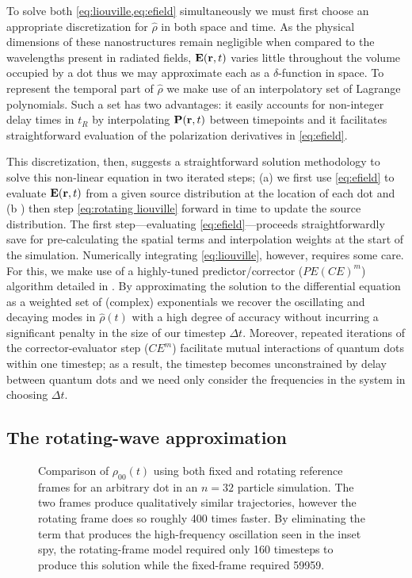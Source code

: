 \documentclass[conference]{IEEEtran}
\begin{document}
To solve both \cref{eq:liouville,eq:efield} simultaneously we must first choose an appropriate discretization for $\hat{\rho}$ in both space and time.
As the physical dimensions of these nanostructures remain negligible when compared to the wavelengths present in radiated fields, $\vb{E}(\vb{r}, t)$ varies little throughout the volume occupied by a dot thus we may approximate each as a $\delta$-function in space.
To represent the temporal part of $\hat{\rho}$ we make use of an interpolatory set of Lagrange polynomials.
Such a set has two advantages: it easily accounts for non-integer delay times in $t_R$ by interpolating $\vb{P}(\vb{r}, t)$ between timepoints and it facilitates straightforward evaluation of the polarization derivatives in \cref{eq:efield}.

This discretization, then, suggests a straightforward solution methodology to solve this non-linear equation in two iterated steps; (a) we first use \cref{eq:efield} to evaluate $\vb{E}(\vb{r}, t)$ from a given source distribution at the location of each dot and (b ) then step \cref{eq:rotating liouville} forward in time to update the source distribution.
The first step---evaluating \cref{eq:efield}---proceeds straightforwardly save for pre-calculating the spatial terms and interpolation weights at the start of the simulation.
Numerically integrating \cref{eq:liouville}, however, requires some care.
For this, we make use of a highly-tuned predictor/corrector ($PE(CE)^m$) algorithm detailed in \cite{Glaser2009}.
By approximating the solution to the differential equation as a weighted set of (complex) exponentials we recover the oscillating and decaying modes in $\hat{\rho}(t)$ with a high degree of accuracy without incurring a significant penalty in the size of our timestep $\Delta t$.
Moreover, repeated iterations of the corrector-evaluator step ($CE^m$) facilitate mutual interactions of quantum dots within one timestep; as a result, the timestep becomes unconstrained by delay between quantum dots and we need only consider the frequencies in the system in choosing $\Delta t$.

\subsection{The rotating-wave approximation}
\begin{figure}
  \centering
  
  \caption{\label{fig:frame comparison}
    Comparison of $\rho_{00}(t)$ using both fixed and rotating reference frames for an arbitrary dot in an $n=32$ particle simulation.
    The two frames produce qualitatively similar trajectories, however the rotating frame does so roughly 400 times faster.
    By eliminating the term that produces the high-frequency oscillation seen in the inset spy, the rotating-frame model required only 160 timesteps to produce this solution while the fixed-frame required 59959.
  }
\end{figure}
\end{document}
